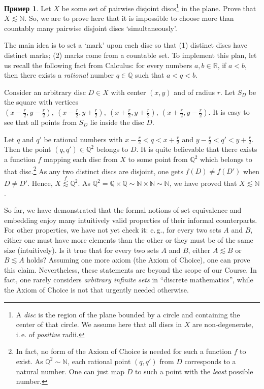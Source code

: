 \documentclass[12pt,notitlepage]{article}
\theoremstyle{plain}
\theoremstyle{definition}
\newtheorem{exm}[thm]{Пример}
\theoremstyle{plain}
\newcommand{\N}{\mathbb{N}}
\newcommand{\Q}{\mathbb{Q}}
\newcommand{\R}{\mathbb{R}}
\newcommand{\1}{\mathbf{1}}
\newcommand{\0}{\mathbf{0}}
\begin{document}
\begin{exm} Let $X$ be some set of pairwise disjoint discs\footnote{A \emph{disc} is the region of the plane bounded by a circle and containing the center of that circle. We assume here that all discs in $X$ are non-degenerate, i.\,e. of \emph{positive} radii.} in the plane. Prove that $X \lesssim \N$. So, we are to prove here that it is impossible to choose more than countably many pairwise disjoint discs `simultaneously'.
	
	The main idea is to set a `mark' upon each disc so that (1) distinct discs have distinct marks; (2) marks come from a countable set. To implement this plan, let us recall the following fact from Calculus: for every numbers $a, b \in \R$, if $a < b$, then there exists a \emph{rational} number $q \in \Q$ such that $a < q < b$.
	
	Consider an arbitrary disc $D \in X$ with center $(x, y)$ and of radius $r$. Let $S_D$ be the square with vertices $(x - \frac{r}{2}, y - \frac{r}{2}),\ (x - \frac{r}{2}, y + \frac{r}{2}),\ (x + \frac{r}{2}, y + \frac{r}{2}),\ (x + \frac{r}{2}, y - \frac{r}{2})$. It is easy to see that all points from $S_D$ lie inside the disc $D$.
	
	Let $q$ and $q'$ be rational numbers with $x - \frac{r}{2} < q < x + \frac{r}{2}$ and $y - \frac{r}{2} < q' < y + \frac{r}{2}$. Then the point $(q, q') \in \Q^2$ belongs to $D$. It is quite believable that there exists a function $f$ mapping each disc from $X$ to some point from $\Q^2$ which belongs to that disc.\footnote{In fact, no form of the Axiom of Choice is needed for such a function $f$ to exist. As $\Q^2 \sim \N$, each rational point $(q, q')$ from $D$ corresponds to a natural number. One can just map $D$ to such a point with the \emph{least} possible number.} As any two distinct discs are disjoint, one gets $f(D) \neq f(D')$ when $D \neq D'$. Hence, $X \stackrel{f}{\lesssim} \Q^2$. As $\Q^2 = \Q \times \Q \sim \N \times \N \sim \N$, we have proved that $X \lesssim \N$.
\end{exm}

So far, we have demonstrated that the formal notions of set equivalence and embedding enjoy many intuitively valid properties of their informal counterparts. For other properties, we have not yet check it: e.\,g., for every two sets $A$ and $B$, either one must have more elements than the other or they must be of the same size (intuitively). Is it true that for every two sets $A$ and $B$, either $A \lesssim B$ or $B \lesssim A$ holds? Assuming one more axiom (the Axiom of Choice), one can prove this claim. Nevertheless, these statements are beyond the scope of our Course. In fact, one rarely considers \emph{arbitrary infinite sets} in ``discrete mathematics'', while the Axiom of Choice is not that urgently needed otherwise. 
\end{document}
